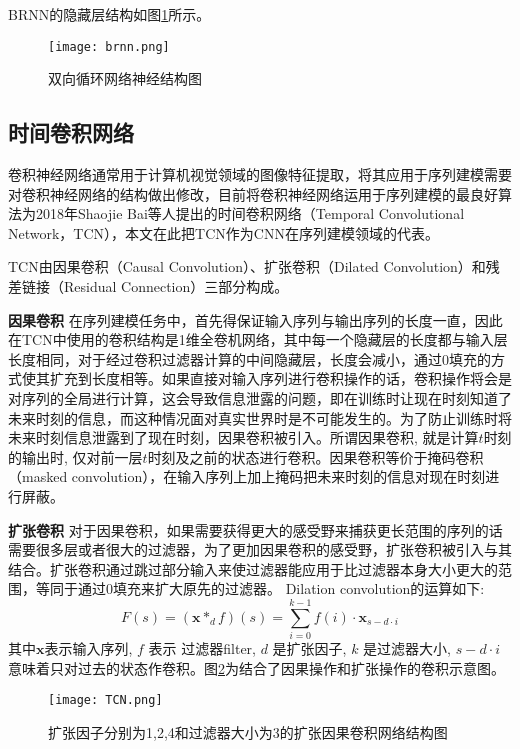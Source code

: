 BRNN的隐藏层结构如图\ref{fig:brnn}所示。
\begin{figure}[htb]
  \centering
  \texttt{[image: brnn.png]}\\
  \caption{双向循环网络神经结构图}
  \label{fig:brnn}
\end{figure}

\subsection{时间卷积网络}
卷积神经网络通常用于计算机视觉领域的图像特征提取，将其应用于序列建模需要对卷积神经网络的结构做出修改，目前将卷积神经网络运用于序列建模的最良好算法为2018年Shaojie Bai等人提出的时间卷积网络（Temporal Convolutional Network，TCN），本文在此把TCN作为CNN在序列建模领域的代表。

TCN由因果卷积（Causal Convolution）、扩张卷积（Dilated Convolution）和残差链接（Residual Connection）三部分构成。

\textbf{因果卷积}
在序列建模任务中，首先得保证输入序列与输出序列的长度一直，因此在TCN中使用的卷积结构是1维全卷机网络，其中每一个隐藏层的长度都与输入层长度相同，对于经过卷积过滤器计算的中间隐藏层，长度会减小，通过0填充的方式使其扩充到长度相等。如果直接对输入序列进行卷积操作的话，卷积操作将会是对序列的全局进行计算，这会导致信息泄露的问题，即在训练时让现在时刻知道了未来时刻的信息，而这种情况面对真实世界时是不可能发生的。为了防止训练时将未来时刻信息泄露到了现在时刻，因果卷积被引入。所谓因果卷积, 就是计算$t$时刻的输出时, 仅对前一层$t$时刻及之前的状态进行卷积。因果卷积等价于掩码卷积（masked convolution），在输入序列上加上掩码把未来时刻的信息对现在时刻进行屏蔽。

\textbf{扩张卷积}
对于因果卷积，如果需要获得更大的感受野来捕获更长范围的序列的话需要很多层或者很大的过滤器，为了更加因果卷积的感受野，扩张卷积被引入与其结合。扩张卷积通过跳过部分输入来使过滤器能应用于比过滤器本身大小更大的范围，等同于通过0填充来扩大原先的过滤器。
Dilation convolution的运算如下:
$$
  F(s)=\left(\mathbf{x} *_{d} f\right)(s)=\sum_{i=0}^{k-1} f(i) \cdot \mathbf{x}_{s-d \cdot i}
$$
其中$\mathbf {x}$表示输入序列, $f$ 表示 过滤器filter, $d$ 是扩张因子,%
 $k$ 是过滤器大小,  $s-d\cdot i$意味着只对过去的状态作卷积。图\ref{fig:TCN}为结合了因果操作和扩张操作的卷积示意图。
\begin{figure}[htb]
  \centering
  \texttt{[image: TCN.png]}\\
  \caption{扩张因子分别为1,2,4和过滤器大小为3的扩张因果卷积网络结构图}
  \label{fig:TCN}
\end{figure}


